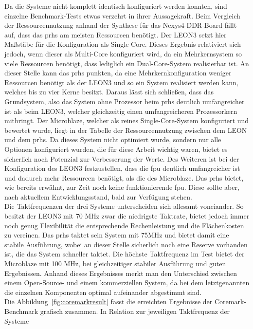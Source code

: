 Da die Systeme nicht komplett identisch konfiguriert werden konnten, sind einzelne Benchmark-Tests etwas verzehrt in ihrer Aussagekraft. Beim Vergleich der Ressourcennutzung
anhand der Synthese für das Nexys4-DDR-Board fällt auf, dass das \ac{prhs} am meisten Ressourcen benötigt. Der LEON3 setzt hier Maßstäbe für die Konfiguration als
Single-Core. Dieses Ergebnis relativiert sich jedoch, wenn dieser als Multi-Core konfiguriert wird, da ein Mehrkernsystem so viele Ressourcen benötigt, dass lediglich
ein Dual-Core-System realisierbar ist. An dieser Stelle kann das \ac{prhs} punkten, da eine Mehrkernkonfiguration weniger Ressourcen benötigt als der LEON3 und so
ein System realisiert werden kann, welches bis zu vier Kerne besitzt. Daraus lässt sich schließen, dass das Grundsystem, also das System ohne Prozessor beim \ac{prhs}
deutlich umfangreicher ist als beim LEON3, welcher gleichzeitig einen umfangreicheren Prozessorkern mitbringt. Der Microblaze, welcher als reines Single-Core-System
konfiguriert und bewertet wurde, liegt in der Tabelle der Ressourcennutzung zwischen dem LEON und dem \ac{prhs}. Da dieses System nicht optimiert wurde, sondern
nur alle Optionen konfiguriert wurden, die für diese Arbeit wichtig waren, bietet es sicherlich noch Potenzial zur Verbesserung der Werte.
Des Weiteren ist bei der Konfiguration des LEON3 festzustellen, dass die \ac{fpu} deutlich umfangreicher ist und dadurch mehr Ressourcen benötigt, als die des Microblaze.
Das \ac{prhs} bietet, wie bereits erwähnt, zur Zeit noch keine funktionierende \ac{fpu}. Diese sollte aber, nach aktuellem Entwicklungsstand, bald zur Verfügung stehen.\\
Die Taktfrequenzen der drei Systeme unterscheiden sich allesamt voneiander. So besitzt der LEON3 mit 70 MHz zwar die niedrigste Taktrate, bietet jedoch immer noch genug
Flexibilität die entsprechende Rechenleistung und die Flächenkosten zu vereinen. Das \ac{prhs} taktet sein System mit 75MHz und bietet damit eine stabile Ausführung,
wobei an dieser Stelle sicherlich noch eine Reserve vorhanden ist, die das System schneller taktet. Die höchste Taktfrequenz im Test bietet der Microblaze mit 100 MHz, bei
gleichzeitiger stabiler Ausführung und guten Ergebnissen. Anhand dieses Ergebnisses merkt man den Unterschied zwischen einem Open-Source- und einem kommerziellen System,
da bei dem letztgenannten die einzelnen Komponenten optimal aufeinander abgestimmt sind.\\
Die Abbildung~\ref{fig:coremarkresult} fasst die erreichten Ergebnisse der Coremark-Benchmark grafisch zusammen. In Relation zur jeweiligen Taktfrequenz der Systeme
